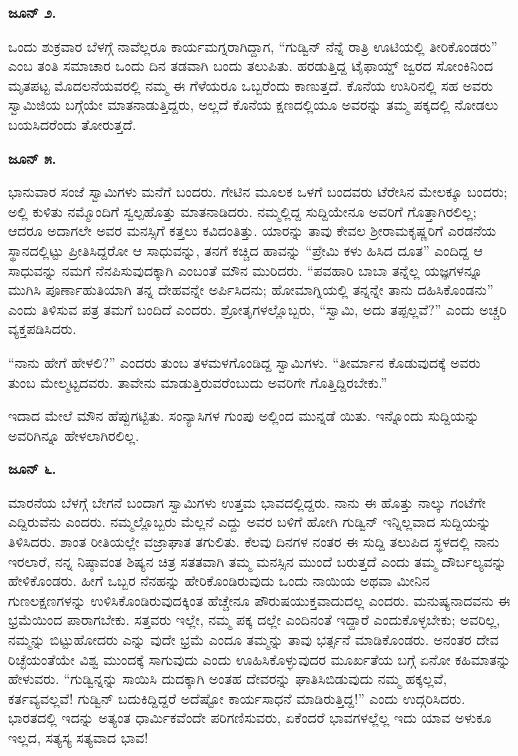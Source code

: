 \textbf{ಜೂನ್ ೨.}

ಒಂದು ಶುಕ್ರವಾರ ಬೆಳಗ್ಗೆ ನಾವೆಲ್ಲರೂ ಕಾರ್ಯಮಗ್ನರಾಗಿದ್ದಾಗ, “ಗುಡ್ವಿನ್ ನೆನ್ನೆ ರಾತ್ರಿ ಊಟಿಯಲ್ಲಿ ತೀರಿಕೊಂಡರು” ಎಂಬ ತಂತಿ ಸಮಾಚಾರ ಒಂದು ದಿನ ತಡವಾಗಿ ಬಂದು ತಲುಪಿತು. ಹರಡುತ್ತಿದ್ದ ಟೈಫಾಯ್ಡ್ ಜ್ವರದ ಸೋಂಕಿನಿಂದ ಮೃತಪಟ್ಟ ಮೊದಲನೆಯವರಲ್ಲಿ ನಮ್ಮ ಈ ಗೆಳೆಯರೂ ಒಬ್ಬರೆಂದು ಕಾಣುತ್ತದೆ. ಕೊನೆಯ ಉಸಿರಿನಲ್ಲಿ ಸಹ ಅವರು ಸ್ವಾಮಿಜಿಯ ಬಗ್ಗೆಯೇ ಮಾತನಾಡುತ್ತಿದ್ದರು, ಅಲ್ಲದೆ ಕೊನೆಯ ಕ್ಷಣದಲ್ಲಿಯೂ ಅವರನ್ನು ತಮ್ಮ ಪಕ್ಕದಲ್ಲಿ ನೋಡಲು ಬಯಸಿದರೆಂದು ತೋರುತ್ತದೆ.

\textbf{ಜೂನ್ ೫.}

ಭಾನುವಾರ ಸಂಜೆ ಸ್ವಾಮಿಗಳು ಮನೆಗೆ ಬಂದರು. ಗೇಟಿನ ಮೂಲಕ ಒಳಗೆ ಬಂದವರು ಟೆರೇಸಿನ ಮೇಲಕ್ಕೂ ಬಂದರು; ಅಲ್ಲಿ ಕುಳಿತು ನಮ್ಮೊಂದಿಗೆ ಸ್ವಲ್ಪಹೊತ್ತು ಮಾತನಾಡಿದರು. ನಮ್ಮಲ್ಲಿದ್ದ ಸುದ್ದಿಯೇನೂ ಅವರಿಗೆ ಗೊತ್ತಾಗಿರಲಿಲ್ಲ; ಆದರೂ ಅದಾಗಲೇ ಅವರ ಮನಸ್ಸಿಗೆ ಕತ್ತಲು ಕವಿದಂತಿತ್ತು. ಯಾರನ್ನು ತಾವು ಕೇವಲ ಶ‍್ರೀರಾಮಕೃಷ್ಣರಿಗೆ ಎರಡನೆಯ ಸ್ಥಾನದಲ್ಲಿಟ್ಟು ಪ್ರೀತಿಸಿದ್ದರೋ ಆ ಸಾಧುವನ್ನು, ತನಗೆ ಕಚ್ಚಿದ ಹಾವನ್ನು “ಪ್ರೇಮಿ ಕಳು ಹಿಸಿದ ದೂತ” ಎಂದಿದ್ದ ಆ ಸಾಧುವನ್ನು ನಮಗೆ ನೆನಪಿಸುವುದಕ್ಕಾಗಿ ಎಂಬಂತೆ ಮೌನ ಮುರಿದರು. “ಪವಹಾರಿ ಬಾಬಾ ತನ್ನೆಲ್ಲ ಯಜ್ಞಗಳನ್ನೂ ಮುಗಿಸಿ ಪೂರ್ಣಾಹುತಿಯಾಗಿ ತನ್ನ ದೇಹವನ್ನೇ ಅರ್ಪಿಸಿದನು; ಹೋಮಾಗ್ನಿಯಲ್ಲಿ ತನ್ನನ್ನೇ ತಾನು ದಹಿಸಿಕೊಂಡನು” ಎಂದು ತಿಳಿಸುವ ಪತ್ರ ತಮಗೆ ಬಂದಿದೆ ಎಂದರು. ಶ್ರೋತೃಗಳಲ್ಲೊಬ್ಬರು, “ಸ್ವಾಮಿ, ಅದು ತಪ್ಪಲ್ಲವೆ?” ಎಂದು ಅಚ್ಚರಿ ವ್ಯಕ್ತಪಡಿಸಿದರು.

“ನಾನು ಹೇಗೆ ಹೇಳಲಿ?” ಎಂದರು ತುಂಬ ತಳಮಳಗೊಂಡಿದ್ದ ಸ್ವಾಮಿಗಳು. “ತೀರ್ಮಾನ ಕೊಡುವುದಕ್ಕೆ ಅವರು ತುಂಬ ಮೇಲ್ಮಟ್ಟದವರು. ತಾವೇನು ಮಾಡುತ್ತಿರುವರೆಂಬುದು ಅವರಿಗೇ ಗೊತ್ತಿದ್ದಿರಬೇಕು.”

ಇದಾದ ಮೇಲೆ ಮೌನ ಹೆಪ್ಪುಗಟ್ಟಿತು. ಸಂನ್ಯಾಸಿಗಳ ಗುಂಪು ಅಲ್ಲಿಂದ ಮುನ್ನಡೆ ಯಿತು. ಇನ್ನೊಂದು ಸುದ್ದಿಯನ್ನು ಅವರಿಗಿನ್ನೂ ಹೇಳಲಾಗಿರಲಿಲ್ಲ.

\textbf{ಜೂನ್ ೬.}

ಮಾರನೆಯ ಬೆಳಗ್ಗೆ ಬೇಗನೆ ಬಂದಾಗ ಸ್ವಾಮಿಗಳು ಉತ್ತಮ ಭಾವದಲ್ಲಿದ್ದರು. ನಾನು ಈ ಹೊತ್ತು ನಾಲ್ಕು ಗಂಟೆಗೇ ಎದ್ದಿರುವೆನು ಎಂದರು. ನಮ್ಮಲ್ಲೊಬ್ಬರು ಮೆಲ್ಲನೆ ಎದ್ದು ಅವರ ಬಳಿಗೆ ಹೋಗಿ ಗುಡ್ವಿನ್ ಇನ್ನಿಲ್ಲವಾದ ಸುದ್ದಿಯನ್ನು ತಿಳಿಸಿದರು. ಶಾಂತ ರೀತಿಯಲ್ಲೇ ವಜ್ರಾಘಾತ ತಗುಲಿತು. ಕೆಲವು ದಿನಗಳ ನಂತರ ಈ ಸುದ್ದಿ ತಲುಪಿದ ಸ್ಥಳದಲ್ಲಿ ನಾನು ಇರಲಾರೆ, ನನ್ನ ನಿಷ್ಠಾವಂತ ಶಿಷ್ಯನ ಚಿತ್ರ ಸತತವಾಗಿ ತಮ್ಮ ಮನಸ್ಸಿನ ಮುಂದೆ ಬರುತ್ತದೆ ಎಂದು ತಮ್ಮ ದೌರ್ಬಲ್ಯವನ್ನು ಹೇಳಿಕೊಂಡರು. ಹೀಗೆ ಒಬ್ಬರ ನೆನಹನ್ನು ಹೇರಿಕೊಂಡಿರುವುದು ಒಂದು ನಾಯಿಯ ಅಥವಾ ಮೀನಿನ ಗುಣಲಕ್ಷಣಗಳನ್ನು ಉಳಿಸಿಕೊಂಡಿರುವುದಕ್ಕಿಂತ ಹೆಚ್ಚೇನೂ ಪೌರುಷಯುಕ್ತವಾದುದಲ್ಲ ಎಂದರು. ಮನುಷ್ಯನಾದವನು ಈ ಭ್ರಮೆಯಿಂದ ಪಾರಾಗಬೇಕು. ಸತ್ತವರು ಇಲ್ಲೇ, ನಮ್ಮ ಪಕ್ಕ ದಲ್ಲೇ ಎಂದಿನಂತೆ ಇದ್ದಾರೆ ಎಂದುಕೊಳ್ಳಬೇಕು; ಅವರಿಲ್ಲ, ನಮ್ಮನ್ನು ಬಿಟ್ಟುಹೋದರು ಎನ್ನು ವುದೇ ಭ್ರಮೆ ಎಂದೂ ತಮ್ಮನ್ನು ತಾವು ಭರ್ತ್ಸನೆ ಮಾಡಿಕೊಂಡರು. ಅನಂತರ ದೇವ ರಿಚ್ಛೆಯಂತೆಯೇ ವಿಶ್ವ ಮುಂದಕ್ಕೆ ಸಾಗುವುದು ಎಂದು ಊಹಿಸಿಕೊಳ್ಳುವುದರ ಮೂರ್ಖತೆಯ ಬಗ್ಗೆ ಏನೋ ಕಹಿಮಾತನ್ನು ಹೇಳುವರು. “ಗುಡ್ವಿನ್ನನ್ನು ಸಾಯಿಸಿ ದುದಕ್ಕಾಗಿ ಅಂತಹ ದೇವರನ್ನು ಘಾತಿಸಿಬಿಡುವುದು ನಮ್ಮ ಹಕ್ಕಲ್ಲವೆ, ಕರ್ತವ್ಯವಲ್ಲವೆ! ಗುಡ್ವಿನ್ ಬದುಕಿದ್ದಿದ್ದರೆ ಅದೆಷ್ಟೋ ಕಾರ್ಯಸಾಧನೆ ಮಾಡಿರುತ್ತಿದ್ದ!” ಎಂದು ಉದ್ಗರಿಸಿದರು. ಭಾರತದಲ್ಲಿ ಇದನ್ನು ಅತ್ಯಂತ ಧಾರ್ಮಿಕವೆಂದೇ ಪರಿಗಣಿಸುವರು, ಏಕೆಂದರೆ ಭಾವಗಳಲ್ಲೆಲ್ಲ ಇದು ಯಾವ ಅಳುಕೂ ಇಲ್ಲದ, ಸತ್ಯಸ್ಯ ಸತ್ಯವಾದ ಭಾವ!


